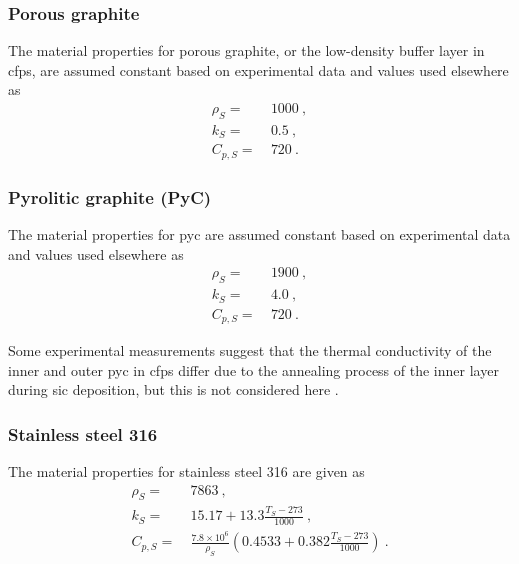 \begin{appendices}
\subsubsection*{Porous graphite}
The material properties for porous graphite, or the low-density buffer layer in \glspl{cfp}, are assumed constant based on experimental data and values used elsewhere \cite{sun,tecdoc1694,xin_wang_thesis,stainsby,parfume,hales,rochais,lopez_honorato} as
\begin{subequations}
\begin{align}
\rho_S=&\ 1000\ ,\\
k_S =&\ 0.5\ , \\
C_{p,S} =&\ 720\ .
\end{align}
\end{subequations}

\subsubsection*{Pyrolitic graphite (PyC)}
The material properties for \gls{pyc} are assumed constant based on experimental data and values used elsewhere \cite{sun,xin_wang_thesis,tecdoc1694,slack,bokros,basini,hales,rochais,stainsby,parfume,cao} as
\begin{subequations}
\begin{align}
\rho_S=&\ 1900\ ,\\
k_S =&\ 4.0\ , \\
C_{p,S} =&\ 720\ .
\end{align}
\end{subequations}

\noindent Some experimental measurements suggest that the thermal conductivity of the inner and outer \gls{pyc} in \glspl{cfp} differ due to the annealing process of the inner layer during \gls{sic} deposition, but this is not considered here \cite{slack,bokros,rochais,basini,lopez_honorato}. 

\subsubsection*{Stainless steel 316}
The material properties for stainless steel 316 are given as \cite{tinte2}
\begin{subequations}
\begin{align}
\rho_S=&\ 7863\ ,\\
\label{eq:k_Ss}
k_S =&\ 15.17+13.3\frac{T_S-273}{1000}\ , \\
\label{eq:cp_ss}
C_{p,S} =&\ \frac{7.8\times 10^6}{\rho_S}\left(0.4533+0.382\frac{T_S-273}{1000}\right)\ .
\end{align}
\end{subequations}


\end{appendices}
